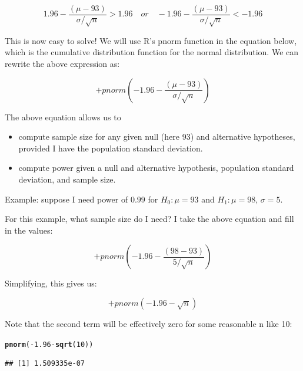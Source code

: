 \documentclass[12pt]{book}\usepackage[]{graphicx}\usepackage[]{color}
\makeatletter
\newcommand{\hlnum}[1]{\textcolor[rgb]{0.686,0.059,0.569}{#1}}%
\newcommand{\hlopt}[1]{\textcolor[rgb]{0,0,0}{#1}}%
\newcommand{\hlstd}[1]{\textcolor[rgb]{0.345,0.345,0.345}{#1}}%
\newcommand{\hlkwd}[1]{\textcolor[rgb]{0.737,0.353,0.396}{\textbf{#1}}}%
\newenvironment{kframe}{%
 \def\at@end@of@kframe{}%
 \ifinner\ifhmode%
  \def\at@end@of@kframe{\end{minipage}}%
  \begin{minipage}{\columnwidth}%
 \fi\fi%
 \def\FrameCommand##1{\hskip\@totalleftmargin \hskip-\fboxsep
 \colorbox{shadecolor}{##1}\hskip-\fboxsep
     \hskip-\linewidth \hskip-\@totalleftmargin \hskip\columnwidth}%
 \MakeFramed {\advance\hsize-\width
   \@totalleftmargin\z@ \linewidth\hsize
   \@setminipage}}%
 {\par\unskip\endMakeFramed%
 \at@end@of@kframe}
\newenvironment{knitrout}{}{} %
\makeatother
\begin{document}
\begin{equation}
1.96 - \frac{(\mu - 93)}{\sigma / \sqrt{n}} > 1.96 
\quad
or 
\quad 
-1.96 - \frac{(\mu - 93)}{\sigma / \sqrt{n}} < -1.96 
\end{equation}

This is now easy to solve! We will use R's pnorm function in the equation below, which is the cumulative distribution function for the normal distribution. 
We can rewrite the above expression as:

\begin{equation}
[1 - pnorm(1.96 - \frac{(\mu - 93)}{\sigma / \sqrt{n}})] + pnorm(-1.96 - \frac{(\mu - 93)}{\sigma / \sqrt{n}})
\end{equation}

The above equation allows us to 

\begin{itemize}
\item
compute sample size for any given null (here 93) and alternative hypotheses, provided I have the population standard deviation.
\item 
compute power given a null and alternative hypothesis, population standard deviation, and sample size.
\end{itemize}

Example: 
suppose I need power of $0.99$ for
$H_0: \mu=93$ 
and $H_1: \mu=98$, $\sigma=5$. 

For this example, what sample size do I need? I take the above equation and fill in the values:

\begin{equation}
[1 - pnorm(1.96 - \frac{(98 - 93)}{5 / \sqrt{n}})] + pnorm(-1.96 - \frac{(98 - 93)}{5 / \sqrt{n}})
\end{equation}

Simplifying, this gives us:

\begin{equation}
[1 - pnorm(1.96 - \sqrt{n})] + pnorm(-1.96 - \sqrt{n})
\end{equation}

Note that the second term will be effectively zero for some reasonable n like 10:

\begin{knitrout}
\color{fgcolor}\begin{kframe}
\begin{alltt}
\hlkwd{pnorm}\hlstd{(}\hlopt{-}\hlnum{1.96}\hlopt{-}\hlkwd{sqrt}\hlstd{(}\hlnum{10}\hlstd{))}
\end{alltt}
\begin{verbatim}
## [1] 1.509335e-07
\end{verbatim}
\end{kframe}
\end{knitrout}
\end{document}
